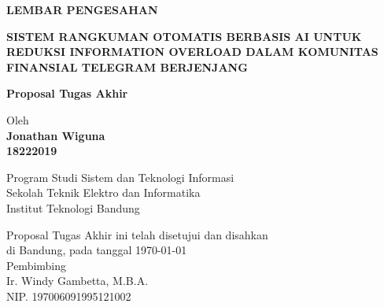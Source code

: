 \documentclass[12pt,a4paper,oneside]{book}
\begin{document}
\newpage
\thispagestyle{empty}
\begin{center}
  \textbf{\large LEMBAR PENGESAHAN}\\[1cm]
  \vspace*{1.5cm}
    
  {\large\bfseries SISTEM RANGKUMAN OTOMATIS BERBASIS AI UNTUK REDUKSI INFORMATION OVERLOAD DALAM KOMUNITAS FINANSIAL TELEGRAM BERJENJANG}\\
     \vspace{2cm}

  {\Large \textbf{Proposal Tugas Akhir}}\\


  \vspace{1.5cm}
    
    
  {\large Oleh}\\[0.3cm]
    \textbf{
    {\large Jonathan Wiguna}\\
    {\large 18222019}
  }\\
    
  \vspace{0.5cm}
 
  {\large Program Studi Sistem dan Teknologi Informasi}\\
  {\large Sekolah Teknik Elektro dan Informatika}\\
  {\large Institut Teknologi Bandung}\\

  \vspace{1.5cm}

  Proposal Tugas Akhir ini telah disetujui dan disahkan\\ 
  di Bandung, pada tanggal \today\\[1cm]

	Pembimbing  \\[3cm]
	Ir. Windy Gambetta, M.B.A.   \\[0.2cm]
	NIP. 197006091995121002 

\end{center}

\vspace{1cm}
\noindent

\end{document}
